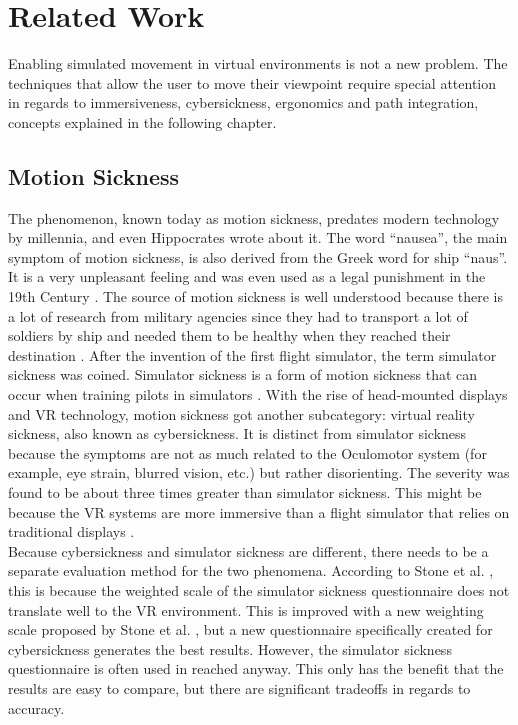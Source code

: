 \chapter{Related Work}
Enabling simulated movement in virtual environments is not a new problem. 
The techniques that allow the user to move their viewpoint require special attention in regards to immersiveness, cybersickness, ergonomics and path integration, concepts explained in the following chapter.



\section{Motion Sickness}\label{motion-sickness}

The phenomenon, known today as motion sickness, predates modern technology
by millennia, and even Hippocrates wrote about it. The word ``nausea'',
the main symptom of motion sickness, is also derived from the Greek word
for ship ``naus''. \cite{Golding} It is a very
unpleasant feeling and was even used as a legal punishment in the 19th
Century \cite{Reason}. The source of motion sickness is
well understood because there is a lot of research from military agencies
since they had to transport a lot of soldiers by ship and needed them to
be healthy when they reached their destination
\cite{Johnson}. After the invention of the first flight
simulator, the term simulator sickness was coined. Simulator sickness is
a form of motion sickness that can occur when training pilots in
simulators \cite{Johnson}. With the rise of head-mounted
displays and VR technology, motion sickness got another subcategory:
virtual reality sickness, also known as cybersickness. It is distinct
from simulator sickness because the symptoms are not as much related to
the Oculomotor system (for example, eye strain, blurred vision, etc.) but
rather disorienting. The severity was found to be about three times greater
than simulator sickness. This might be because the VR systems are more
immersive than a flight simulator that relies on traditional displays
\cite{Stanney}.\\Because cybersickness and simulator
sickness are different, there needs to be a separate evaluation method
for the two phenomena. According to Stone et al. \cite{Stone}, this is because the
weighted scale of the simulator sickness questionnaire does not
translate well to the VR environment. This is improved with a new
weighting scale proposed by Stone et al. \cite{Stone}, but a new questionnaire
specifically created for cybersickness generates the best results.
However, the simulator sickness questionnaire is often used in reached
anyway. This only has the benefit that the results are easy to compare, but there are significant tradeoffs in regards to accuracy.

